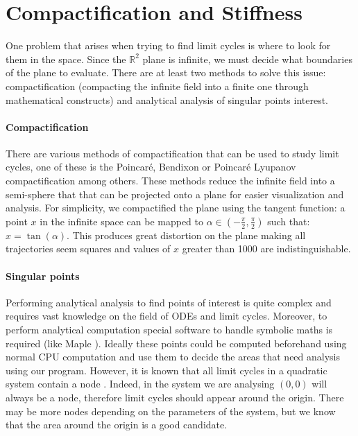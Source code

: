 
\section{Compactification and Stiffness}%
\label{sec:compact-stiff}

One problem that arises when trying to find limit cycles is where to look for them in the space. Since the $\mathbb{R}^2$ plane is infinite, we must decide what boundaries of the plane to evaluate. There are at least two methods to solve this issue: compactification (compacting the infinite field into a finite one through mathematical constructs) and analytical analysis of singular points interest.

\paragraph{Compactification}
There are various methods of compactification that can be used to study limit cycles, one of these is the Poincaré, Bendixon or Poincaré Lyupanov compactification \cite{poincare_sur_1891,bendixson_sur_1901,dumortier_poincare_2006,noauthor_fig_nodate} among others. These methods reduce the infinite field into a semi-sphere that that can be projected onto a plane for easier visualization and analysis. For simplicity, we compactified the plane using the tangent function: a point $x$ in the infinite space can be mapped to $\alpha \in \left(-\frac{\pi}{2}, \frac{\pi}{2}\right)$ such that: $x = \tan(\alpha)$. This produces great distortion on the plane making all trajectories seem squares and values of $x$ greater than 1000 are indistinguishable.

\paragraph{Singular points}
Performing analytical analysis to find points of interest is quite complex and requires vast knowledge on the field of ODEs and limit cycles. Moreover, to perform analytical computation special software to handle symbolic maths is required (like Maple \cite{noauthor_maple_nodate}). Ideally these points could be computed beforehand using normal CPU computation and use them to decide the areas that need analysis using our program. However, it is known that all limit cycles in a quadratic system contain a node \cite{cherkas_quadratic_2003}. Indeed, in the system we are analysing $(0,0)$ will always be a node, therefore limit cycles should appear around the origin. There may be more nodes depending on the parameters of the system, but we know that the area around the origin is a good candidate.

